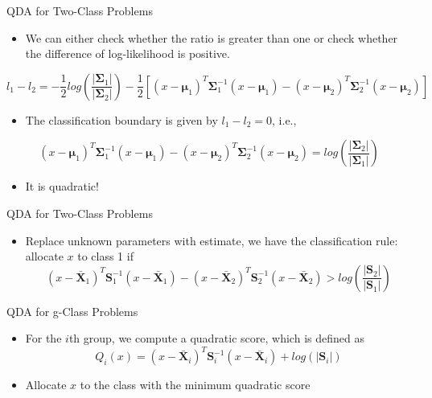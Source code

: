 \documentclass[
  ignorenonframetext,
]{beamer}
\providecommand{\tightlist}{%
  \setlength{\itemsep}{0pt}\setlength{\parskip}{0pt}}
\begin{document}
\begin{frame}{QDA for Two-Class Problems}
\protect\hypertarget{qda-for-two-class-problems-3}{}
\begin{itemize}
\tightlist
\item
  We can either check whether the ratio is greater than one or check
  whether the difference of log-likelihood is positive.
\end{itemize}

\[l_1 - l_2=-\frac{1}{2}log(\frac{|\boldsymbol\Sigma_1|}{|\boldsymbol\Sigma_2|}) - \frac{1}{2} [(x-\boldsymbol \mu_1)^T \boldsymbol \Sigma_1^{-1} (x-\boldsymbol \mu_1) - (x-\boldsymbol \mu_2)^T \boldsymbol \Sigma_2^{-1} (x-\boldsymbol \mu_2)]\]

\begin{itemize}
\tightlist
\item
  The classification boundary is given by \(l_1-l_2=0\), i.e.,
\end{itemize}

\[(x-\boldsymbol \mu_1)^T \boldsymbol \Sigma_1^{-1} (x-\boldsymbol \mu_1) - (x-\boldsymbol \mu_2)^T \boldsymbol \Sigma_2^{-1} (x-\boldsymbol \mu_2) = log(\frac{|\boldsymbol\Sigma_2|}{|\boldsymbol\Sigma_1|})\]

\begin{itemize}
\tightlist
\item
  It is quadratic!
\end{itemize}
\end{frame}

\begin{frame}{QDA for Two-Class Problems}
\protect\hypertarget{qda-for-two-class-problems-4}{}
\begin{itemize}
\tightlist
\item
  Replace unknown parameters with estimate, we have the classification
  rule: allocate \(x\) to class 1 if
  \[(x-\bar {\mathbf X}_1)^T \mathbf S _1^{-1} (x-\bar {\mathbf X}_1) - (x-\bar {\mathbf X}_2)^T \mathbf S_2^{-1} (x-\bar {\mathbf X}_2) > log(\frac{|\mathbf S_2|}{|\mathbf S_1|})\]
\end{itemize}
\end{frame}

\begin{frame}{QDA for g-Class Problems}
\protect\hypertarget{qda-for-g-class-problems}{}
\begin{itemize}
\item
  For the \(i\)th group, we compute a quadratic score, which is defined
  as\\
  \[Q_i(x)=(x-\bar {\mathbf X}_i)^T \mathbf S _i^{-1} (x-\bar {\mathbf X}_i)+ log(|\mathbf S_i|)\]
\item
  Allocate \(x\) to the class with the minimum quadratic score
\end{itemize}
\end{frame}
\end{document}
